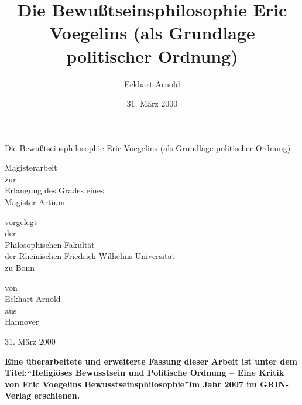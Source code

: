 \documentclass[12pt,a4paper,oneside]{book}
\begin{document}
\begin{titlepage}

\title{Die Bewußtseinsphilosophie Eric Voegelins (als Grundlage politischer Ordnung)}
\author{Eckhart Arnold}
\date{31. März 2000}

\setlength{\parindent}{0em}


\setlength{\parskip}{2cm}

\begin{center} {\Large Die Bewußtseinsphilosophie Eric Voegelins (als Grundlage
    politischer Ordnung)} \end{center}

\setlength{\parskip}{1.5cm}

\begin{center} {\large Magisterarbeit\\zur\\Erlangung des Grades
    eines\\Magister Artium} \end{center}

\setlength{\parskip}{1cm}

\begin{center} {\large vorgelegt\\der\\Philosophischen Fakultät\\der
    Rheinischen Friedrich-Wilhelms-Universität\\zu Bonn} \end{center}

\setlength{\parskip}{0.5cm}

\begin{center} {\large von\\Eckhart Arnold\\aus\\Hannover} \end{center}

\setlength{\parskip}{0.5cm}

\begin{center} 31. März 2000 \end{center}

\setlength{\parskip}{1cm}

\begin{center}
{\large\bf Eine überarbeitete und erweiterte Fassung dieser Arbeit ist
  unter dem Titel:\linebreak \linebreak "`Religiöses Bewusstsein und Politische Ordnung -- Eine
  Kritik von Eric Voegelins Bewusstseinsphilosophie"'\linebreak \linebreak im Jahr 2007 im GRIN-Verlag
  erschienen.}
\end{center}

\end{titlepage}
\end{document}
